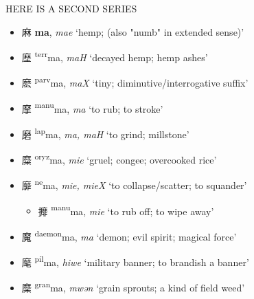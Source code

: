 



HERE IS A SECOND SERIES 

    \begin{itemize}
  \item {\Large{麻}} %
    {\large{\textbf{ma}}},
    \textit{mae} `hemp; (also "numb" in extended sense)' %

  \item {\Large{塺}} %
    {\large{{\textsuperscript{terr}}ma}},
    \textit{maH} `decayed hemp; hemp ashes' %

  \item {\Large{麽}} %
    {\large{{\textsuperscript{parv}}ma}},
    \textit{maX} `tiny; diminutive/interrogative suffix' %

  \item {\Large{摩}} %
    {\large{{\textsuperscript{manu}}ma}},
    \textit{ma} `to rub; to stroke' %

  \item {\Large{磨}} %
    {\large{{\textsuperscript{lap}}ma}},
    \textit{ma, maH} `to grind; millstone' %

  \item {\Large{糜}} %
    {\large{{\textsuperscript{oryz}}ma}},
    \textit{mie} `gruel; congee; overcooked rice' %

  \item {\Large{靡}} %
    {\large{{\textsuperscript{ne}}ma}},
    \textit{mie, mieX} `to collapse/scatter; to squander' %

\begin{itemize}
    \item {\Large{攠}} %
    {\large{{\textsuperscript{manu}}ma}},
    \textit{mie} `to rub off; to wipe away' %
\end{itemize}

 \item {\Large{魔}} %
    {\large{{\textsuperscript{daemon}}ma}},
    \textit{ma} `demon; evil spirit; magical force' %

  \item {\Large{麾}} %
    {\large{{\textsuperscript{pil}}ma}},
    \textit{hiwe} `military banner; to brandish a banner' %
  
  \item {\Large{穈}} %
    {\large{{\textsuperscript{gran}}ma}},
    \textit{mwən} `grain sprouts; a kind of field weed' %

\end{itemize}


